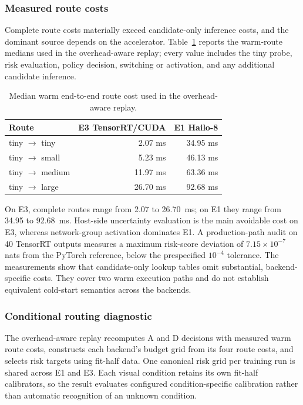 \documentclass[a4paper,review,12pt]{elsarticle}
\begin{document}
\subsubsection{Measured route costs}

Complete route costs materially exceed candidate-only inference costs, and the dominant source depends on the accelerator. Table~\ref{tab:routes} reports the warm-route medians used in the overhead-aware replay; every value includes the tiny probe, risk evaluation, policy decision, switching or activation, and any additional candidate inference.

\begin{table}[t]
\centering
\caption{Median warm end-to-end route cost used in the overhead-aware replay.}
\label{tab:routes}
\begin{tabular}{@{}lrr@{}}
\toprule
Route & E3 TensorRT/CUDA & E1 Hailo-8 \\
\midrule
tiny $\rightarrow$ tiny & 2.07 ms & 34.95 ms \\
tiny $\rightarrow$ small & 5.23 ms & 46.13 ms \\
tiny $\rightarrow$ medium & 11.97 ms & 63.36 ms \\
tiny $\rightarrow$ large & 26.70 ms & 92.68 ms \\
\bottomrule
\end{tabular}
\end{table}

On E3, complete routes range from 2.07 to 26.70~ms; on E1 they range from 34.95 to 92.68~ms. Host-side uncertainty evaluation is the main avoidable cost on E3, whereas network-group activation dominates E1. A production-path audit on 40 TensorRT outputs measures a maximum risk-score deviation of $7.15\times10^{-7}$ nats from the PyTorch reference, below the prespecified $10^{-4}$ tolerance. The measurements show that candidate-only lookup tables omit substantial, backend-specific costs. They cover two warm execution paths and do not establish equivalent cold-start semantics across the backends.



\subsubsection{Conditional routing diagnostic}

The overhead-aware replay recomputes A and D decisions with measured warm route costs, constructs each backend's budget grid from its four route costs, and selects risk targets using fit-half data. One canonical risk grid per training run is shared across E1 and E3. Each visual condition retains its own fit-half calibrators, so the result evaluates configured condition-specific calibration rather than automatic recognition of an unknown condition.
\end{document}
